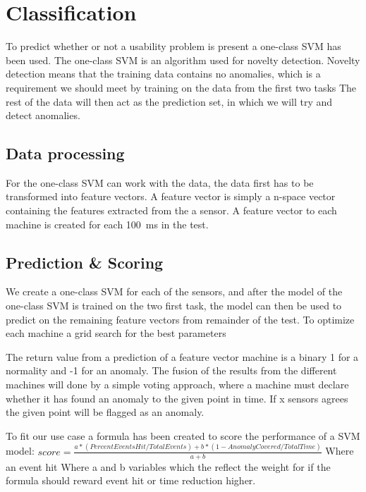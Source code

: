 \section{Classification}
To predict whether or not a usability problem is present a one-class SVM has been used.
The one-class SVM is an algorithm used for novelty detection. Novelty detection means that the training data contains no anomalies, which is a requirement we should meet by training on the data from the first two tasks
The rest of the data will then act as the prediction set, in which we will try and detect anomalies.

\subsection{Data processing}
For the one-class SVM can work with the data, the data first has to be transformed into feature vectors.
A feature vector is simply a n-space vector containing the features extracted from the a sensor.
A feature vector to each machine is created for each 100~ms in the test.

\subsection{Prediction \& Scoring}
We create a one-class SVM for each of the sensors, and after the model of the one-class SVM is trained on the two first task, the model can then be used to predict on the remaining feature vectors from remainder of the test.
To optimize each machine a grid search for the best parameters
  
The return value from a prediction of a feature vector machine is a binary 1 for a normality and -1 for an anomaly.
The fusion of the results from the different machines will done by a simple voting approach, where a machine must declare whether it has found an anomaly to the given point in time. If x sensors agrees the given point will be flagged as an anomaly. 

To fit our use case a formula has been created to score the performance of a SVM model: $score = \frac{a*(PercentEventsHit/TotalEvents)+ b*(1-AnomalyCovered/TotalTime)}{a+b}$
Where an event hit 
Where a and b variables which the reflect the weight for if the formula should reward event hit or time reduction higher.


